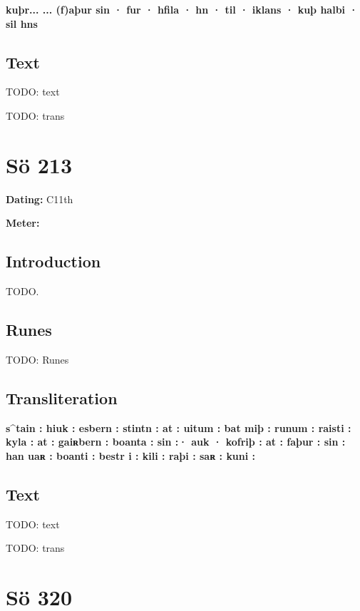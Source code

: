 \textbf{kuþr... ... (f)aþur sin · fur · hfila · hn · til · iklans · kuþ halbi · sil hns}

\subsection{Text}

\bpg\bpa[0]%
TODO: text\epa

\bpb TODO: trans\epb\epg

\sectionline\clearpage


\section{Sö 213}

\begin{flushright}%
\textbf{Dating:} C11th

\textbf{Meter:} \Fornyrdislag
\end{flushright}%

\subsection{Introduction}

TODO.

\subsection{Runes}

TODO: Runes%

\subsection{Transliteration}

\textbf{s\textasciicircum tain : hiuk : esbern : stintn : at : uitum : bat miþ : runum : raisti : kyla : at : gaiʀbern : boanta : sin :· auk · kofriþ : at : faþur : sin : han uaʀ : boanti : bestr i : kili : raþi : saʀ : kuni :}

\subsection{Text}

\bpg\bpa[0]%
TODO: text\epa

\bpb TODO: trans\epb\epg

\sectionline\clearpage


\section{Sö 320}

